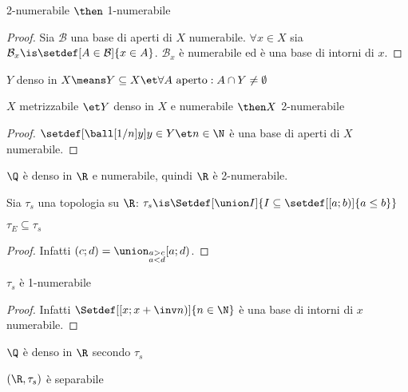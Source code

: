 
\begin{lemma}
2-numerabile $\then$ 1-numerabile
\end{lemma}
\begin{proof}
Sia $\mathcal B$ una base di aperti di $X$ numerabile. $\forall x\in X$ sia $\mathcal B_x\is\setdef[A\in\mathcal B]{x\in A}$. $\mathcal B_x$ è numerabile ed è una base di intorni di $x$.
\end{proof}

\begin{defn}[Densità]
$Y$ denso in $X\means Y\subseteq X\et\forall A\text{ aperto}:A\cap Y\neq\emptyset$
\end{defn}

\begin{lemma}
$X$ metrizzabile $\et Y$ denso in $X$ e numerabile $\then X$ 2-numerabile
\end{lemma}
\begin{proof}
$\setdef[{\ball[1/n]y}]{y\in Y\et n\in\N}$ è una base di aperti di $X$ numerabile.
\end{proof}

\begin{es}
$\Q$ è denso in $\R$ e numerabile, quindi $\R$ è 2-numerabile.
\end{es}

\begin{defn}
Sia $\tau_s$ una topologia su $\R$: $\tau_s\is\Setdef[\union I]{I\subseteq\setdef[[a;b)]{a\leq b}}$
\end{defn}

\begin{prop}
$\tau_E\subseteq\tau_s$
\end{prop}
\begin{proof}
Infatti $(c;d)=\union_{\substack{a>c\\a<d}}[a;d)$.
\end{proof}

\begin{prop}
$\tau_s$ è 1-numerabile
\end{prop}
\begin{proof}
Infatti $\Setdef[\left[x;x+\inv n\right)]{n\in\N}$ è una base di intorni di $x$ numerabile.
\end{proof}

\begin{prop}
$\Q$ è denso in $\R$ secondo $\tau_s$
\end{prop}

\begin{prop}
$(\R,\tau_s)$ è separabile
\end{prop}

